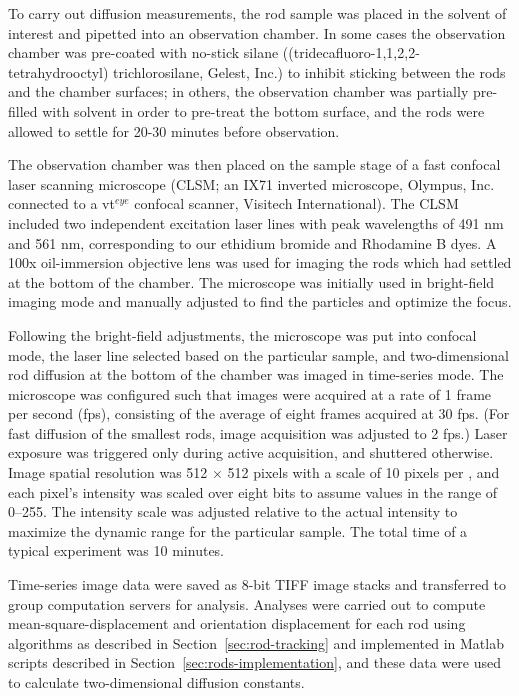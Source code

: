 To carry out diffusion measurements, the rod sample was placed in the solvent of interest and pipetted into an observation 
chamber.  In some cases the observation chamber was pre-coated with no-stick silane ((tridecafluoro-1,1,2,2-tetrahydrooctyl) 
trichlorosilane, Gelest, Inc.) to inhibit sticking between the rods and the chamber surfaces; in others,
the observation chamber was partially pre-filled with solvent in order to pre-treat the 
bottom surface, and the rods were allowed to settle for 20-30 minutes before observation.

The observation chamber was then placed on the sample stage of a fast confocal laser scanning microscope (CLSM; 
an IX71 inverted microscope, Olympus, Inc. connected to a vt$^{eye}$ confocal scanner, Visitech International). The CLSM
included two independent excitation laser lines with peak wavelengths of 491 nm and 561 nm, corresponding to our ethidium 
bromide and Rhodamine B dyes.  A 100x oil-immersion objective lens was used for imaging the rods which had settled at the bottom
of the chamber.  The microscope was initially used in bright-field imaging mode and manually adjusted to find the particles and 
optimize the focus.

Following the bright-field adjustments, the microscope was put into confocal mode, the laser line selected 
based on the particular sample, and two-dimensional rod diffusion at the 
bottom of the chamber was imaged in time-series mode.  The microscope was configured such that images were acquired at
a rate of 1 frame per second (fps), consisting of the average of eight frames acquired at 30 fps.  
(For fast diffusion of the smallest rods,
image acquisition was adjusted to 2 fps.)  Laser exposure was triggered only during active 
acquisition, and shuttered otherwise.  Image spatial resolution was 512 $\times$ 512 pixels with a scale of 10 pixels
per \microns, and each pixel's intensity was scaled over eight bits to assume values in the range of 0--255.
The intensity scale was adjusted relative to the actual intensity to maximize the dynamic range for the particular sample.
The total time of a typical experiment was 10 minutes.

Time-series image data were saved as 8-bit TIFF image stacks and transferred to group computation servers for analysis.
Analyses were carried out to compute mean-square-displacement and orientation displacement for each rod using algorithms as 
described in Section~\ref{sec:rod-tracking} and implemented in Matlab scripts described in Section~\ref{sec:rods-implementation}, 
and these data
were used to calculate two-dimensional diffusion constants.  

